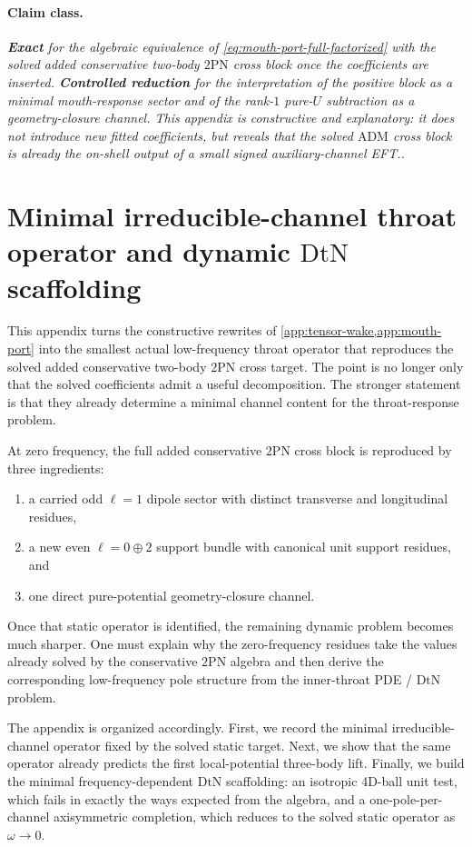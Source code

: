 \documentclass[11pt]{article}
\newcommand{\TwoPN}{\mathrm{2PN}}
\newcommand{\ADM}{\mathrm{ADM}}
\newcommand{\DtN}{\mathrm{DtN}}
\newcommand{\Exact}{\textbf{Exact}}
\newcommand{\Controlled}{\textbf{Controlled reduction}}
\newcommand{\claimclass}[1]{\paragraph{Claim class.}\emph{#1.}}
\begin{document}
\claimclass{\Exact{} for the algebraic equivalence of
\cref{eq:mouth-port-full-factorized} with the solved added conservative two-body
\(\TwoPN\) cross block once the coefficients are inserted.  \Controlled{} for the
interpretation of the positive block as a minimal mouth-response sector and of the
rank-\(1\) pure-\(U\) subtraction as a geometry-closure channel.  This appendix is
constructive and explanatory: it does not introduce new fitted coefficients, but reveals
that the solved \(\ADM\) cross block is already the on-shell output of a small signed
auxiliary-channel EFT.}

\section{Minimal irreducible-channel throat operator and dynamic \texorpdfstring{$\DtN$}{DtN} scaffolding}
\label{app:irred-dtn}

This appendix turns the constructive rewrites of
\cref{app:tensor-wake,app:mouth-port}
into the smallest actual low-frequency throat operator that reproduces the solved added
conservative two-body \(\TwoPN\) cross target.  The point is no longer only that the
solved coefficients admit a useful decomposition.  The stronger statement is that they
already determine a minimal channel content for the throat-response problem.

At zero frequency, the full added conservative \(\TwoPN\) cross block is reproduced by
three ingredients:
\begin{enumerate}[leftmargin=1.5em]
  \item a carried odd \(\ell=1\) dipole sector with distinct transverse and
  longitudinal residues,
  \item a new even \(\ell=0\oplus 2\) support bundle with canonical unit support
  residues, and
  \item one direct pure-potential geometry-closure channel.
\end{enumerate}
Once that static operator is identified, the remaining dynamic problem becomes much
sharper.  One must explain why the zero-frequency residues take the values already solved
by the conservative \(\TwoPN\) algebra and then derive the corresponding low-frequency
pole structure from the inner-throat PDE / \(\DtN\) problem.

The appendix is organized accordingly.  First, we record the minimal irreducible-channel
operator fixed by the solved static target.  Next, we show that the same operator already
predicts the first local-potential three-body lift.  Finally, we build the minimal
frequency-dependent \(\DtN\) scaffolding: an isotropic 4D-ball unit test, which fails in
exactly the ways expected from the algebra, and a one-pole-per-channel axisymmetric
completion, which reduces to the solved static operator as \(\omega\to 0\).
\end{document}
